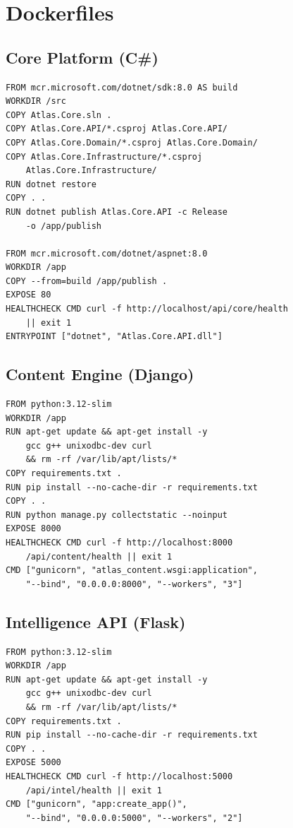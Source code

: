\documentclass[12pt,letterpaper]{article}
\begin{document}
\newpage

\section{Dockerfiles}

\subsection{Core Platform (C\#)}
\begin{lstlisting}[style=code]
FROM mcr.microsoft.com/dotnet/sdk:8.0 AS build
WORKDIR /src
COPY Atlas.Core.sln .
COPY Atlas.Core.API/*.csproj Atlas.Core.API/
COPY Atlas.Core.Domain/*.csproj Atlas.Core.Domain/
COPY Atlas.Core.Infrastructure/*.csproj
    Atlas.Core.Infrastructure/
RUN dotnet restore
COPY . .
RUN dotnet publish Atlas.Core.API -c Release
    -o /app/publish

FROM mcr.microsoft.com/dotnet/aspnet:8.0
WORKDIR /app
COPY --from=build /app/publish .
EXPOSE 80
HEALTHCHECK CMD curl -f http://localhost/api/core/health
    || exit 1
ENTRYPOINT ["dotnet", "Atlas.Core.API.dll"]
\end{lstlisting}

\subsection{Content Engine (Django)}
\begin{lstlisting}[style=code]
FROM python:3.12-slim
WORKDIR /app
RUN apt-get update && apt-get install -y
    gcc g++ unixodbc-dev curl
    && rm -rf /var/lib/apt/lists/*
COPY requirements.txt .
RUN pip install --no-cache-dir -r requirements.txt
COPY . .
RUN python manage.py collectstatic --noinput
EXPOSE 8000
HEALTHCHECK CMD curl -f http://localhost:8000
    /api/content/health || exit 1
CMD ["gunicorn", "atlas_content.wsgi:application",
    "--bind", "0.0.0.0:8000", "--workers", "3"]
\end{lstlisting}

\subsection{Intelligence API (Flask)}
\begin{lstlisting}[style=code]
FROM python:3.12-slim
WORKDIR /app
RUN apt-get update && apt-get install -y
    gcc g++ unixodbc-dev curl
    && rm -rf /var/lib/apt/lists/*
COPY requirements.txt .
RUN pip install --no-cache-dir -r requirements.txt
COPY . .
EXPOSE 5000
HEALTHCHECK CMD curl -f http://localhost:5000
    /api/intel/health || exit 1
CMD ["gunicorn", "app:create_app()",
    "--bind", "0.0.0.0:5000", "--workers", "2"]
\end{lstlisting}
\end{document}
